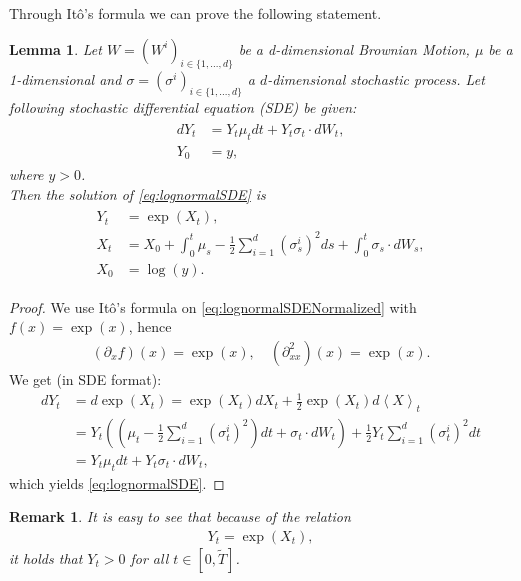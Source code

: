 \documentclass[12pt]{article}
\newtheorem{lemma}[theorem]{Lemma}
\newtheorem{remark}[theorem]{Remark}
\begin{document}
	Through Itô's formula we can prove the following statement.
	\begin{lemma}\label{lm:logNormalDyn}
		Let $W=(W^i)_{i\in \{1, ..., d\}}$ be a d-dimensional Brownian Motion, $\mu$ be a 1-dimensional and $\sigma = (\sigma^i)_{i\in \{1, ..., d\}}$ a $d$-dimensional stochastic process. Let following stochastic differential equation (SDE) be given:
		\begin{align}\label{eq:lognormalSDE}
			\begin{aligned}
				dY_t &= Y_t \mu_t dt + Y_t \sigma_t \cdot dW_t,\\
				Y_0 &= y,
			\end{aligned}
		\end{align}
		where $y > 0$.\\
		Then the solution of \cref{eq:lognormalSDE} is \begin{align}\label{eq:lognormalSDENormalized}
			\begin{aligned}
				Y_t &= \exp(X_t),\\
				X_t &= X_0 + \int_{0}^{t}\mu_s - \frac{1}{2}\sum_{i=1}^{d}(\sigma^i_s)^2ds + \int_{0}^{t}\sigma_s \cdot dW_s,\\
				X_0 &= \log(y).
			\end{aligned}
		\end{align}
	\end{lemma}
	\begin{proof}
		We use Itô's formula on \cref{eq:lognormalSDENormalized} with $f(x) = \exp(x)$, hence 
		\begin{align*}
			(\partial_xf)(x) = \exp(x), \quad (\partial^2_{xx})(x) = \exp(x).
		\end{align*}
		We get (in SDE format):
		\begin{align*}
			dY_t &= d\exp(X_t) = \exp(X_t)dX_t + \frac{1}{2}\exp(X_t)d\left\langle X \right\rangle_t\\
			&=	Y_t\left(\left(\mu_t -\frac{1}{2}\sum_{i=1}^{d}(\sigma^i_t)^2\right)dt + \sigma_t \cdot dW_t\right) + \frac{1}{2}Y_t \sum_{i=1}^{d}(\sigma^i_t)^2 dt\\
			&= Y_t \mu_t dt + Y_t \sigma_t \cdot dW_t,
		\end{align*}
		which yields \cref{eq:lognormalSDE}.
	\end{proof}
	\begin{remark}
		It is easy to see that because of the relation 
		\begin{align*}
			Y_t = \exp(X_t),
		\end{align*}
		it holds that $Y_t > 0$ for all $t \in [0,\tilde{T}]$.
	\end{remark}
	
\end{document}
